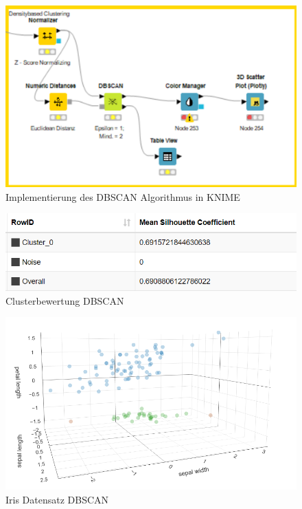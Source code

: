 \documentclass[
	handout,
  	aspectratio=169
]{beamer}
\begin{document}
	\begin{frame}
	\begin{center}					
					\begin{figure}[h]
						\includegraphics[scale=0.7]{../pictures/dichte.png}
						\caption{Implementierung des DBSCAN Algorithmus in KNIME}		
					\end{figure}	
				\end{center}	
	\end{frame}
	
	\begin{frame}
	\begin{center}					
					\begin{figure}[h]
						\includegraphics[scale=0.7]{../pictures/sil_dens.png}
						\caption{Clusterbewertung DBSCAN}		
					\end{figure}	
				\end{center}	
	\end{frame}
	\begin{frame}
	\begin{center}					
					\begin{figure}[h]
						\includegraphics[scale=0.7]{../pictures/cluster_iris.png}
						\caption{Iris Datensatz DBSCAN}		
					\end{figure}	
				\end{center}	
	\end{frame}
	
\end{document}
